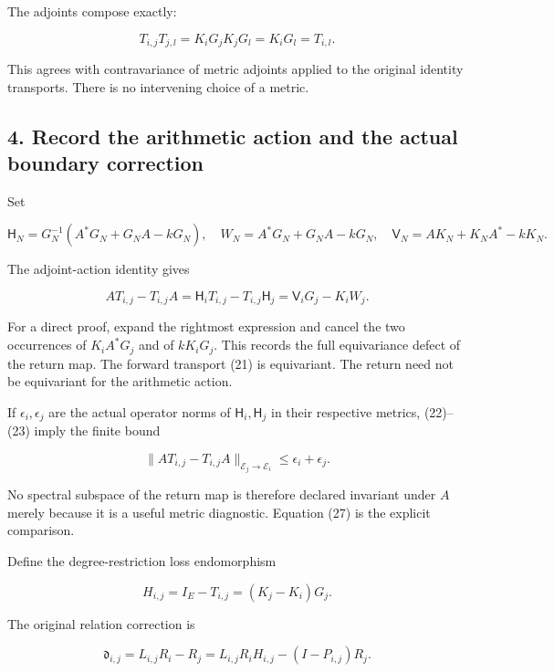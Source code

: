The adjoints compose exactly:

\[
 T_{i,j}T_{j,l}=K_iG_jK_jG_l=K_iG_l=T_{i,l}.                      \tag{25}
\]

This agrees with contravariance of metric adjoints applied to the original identity transports. There is no intervening choice of a metric.

\subsection{4. Record the arithmetic action and the actual boundary correction}\label{endpoint-restriction_original--record-the-arithmetic-action-and-the-actual-boundary-correction}

Set

\[
 \mathsf H_N=G_N^{-1}(A^*G_N+G_NA-kG_N),\quad
 W_N=A^*G_N+G_NA-kG_N,\quad
 \mathsf V_N=AK_N+K_NA^*-kK_N.                                   \tag{26}
\]

The adjoint-action identity gives

\[
 \boxed{AT_{i,j}-T_{i,j}A
 =\mathsf H_iT_{i,j}-T_{i,j}\mathsf H_j
 =\mathsf V_iG_j-K_iW_j.}                                       \tag{27}
\]

For a direct proof, expand the rightmost expression and cancel the two occurrences of \(K_iA^*G_j\) and of \(kK_iG_j\). This records the full equivariance defect of the return map. The forward transport (21) is equivariant. The return need not be equivariant for the arithmetic action.

If \(\epsilon_i,\epsilon_j\) are the actual operator norms of \(\mathsf H_i,\mathsf H_j\) in their respective metrics, (22)--(23) imply the finite bound

\[
 \|AT_{i,j}-T_{i,j}A\|_{\mathscr E_j\to\mathscr E_i}
 \le\epsilon_i+\epsilon_j.                                      \tag{28}
\]

No spectral subspace of the return map is therefore declared invariant under \(A\) merely because it is a useful metric diagnostic. Equation (27) is the explicit comparison.

Define the degree-restriction loss endomorphism

\[
 H_{i,j}=I_E-T_{i,j}=(K_j-K_i)G_j.                                \tag{29}
\]

The original relation correction is

\[
 \boxed{\mathfrak d_{i,j}=L_{i,j}R_i-R_j
 =L_{i,j}R_iH_{i,j}-(I-P_{i,j})R_j.}                              \tag{30}
\]

